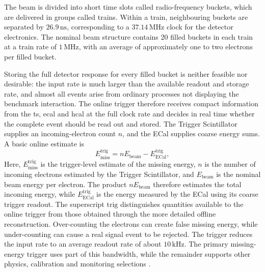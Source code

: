 


The beam is divided into short time slots called radio-frequency buckets,
which are delivered in groups called trains. Within a train, neighbouring
buckets are separated by \(26.9\,\mathrm{ns}\), corresponding to a
\(37.14\,\mathrm{MHz}\) clock for the detector electronics. The nominal beam
structure contains 20 filled buckets in each train at a train rate of
\(1\,\mathrm{MHz}\), with an average of approximately one to two electrons
per filled bucket. 

Storing the full detector response for every filled bucket is neither feasible nor desirable:
the input rate is much larger than the available readout and storage rate,
and almost all events arise from ordinary processes not displaying the benchmark interaction. 
The online trigger
therefore receives compact information from the \gls{ts}, \gls{ecal} and
\gls{hcal} at the full clock rate and decides in real time whether the complete
event should be read out and stored. The Trigger Scintillator supplies an
incoming-electron count \(n\), and the ECal supplies coarse energy sums. A
basic online estimate is
\begin{equation}
    E_{\mathrm{miss}}^{\mathrm{trig}}
    =
    nE_{\mathrm{beam}} - E_{\mathrm{ECal}}^{\mathrm{trig}} ,
\end{equation}
Here, \(E_{\mathrm{miss}}^{\mathrm{trig}}\) is the trigger-level estimate of
the missing energy, \(n\) is the number of incoming electrons estimated by
the Trigger Scintillator, and \(E_{\mathrm{beam}}\) is the nominal beam energy
per electron. The product \(nE_{\mathrm{beam}}\) therefore estimates the total
incoming energy, while \(E_{\mathrm{ECal}}^{\mathrm{trig}}\) is the energy
measured by the ECal using its coarse trigger readout. The superscript
\(\mathrm{trig}\) distinguishes quantities available to the online trigger
from those obtained through the more detailed offline reconstruction.
Over-counting the electrons can create false missing energy, while
under-counting can cause a real signal event to be rejected. The trigger
reduces the input rate to an average readout rate of about
\(10\,\mathrm{kHz}\). The primary missing-energy trigger uses part of this
bandwidth, while the remainder supports other physics, calibration and
monitoring selections \cite{ldmx2025-overview}.

